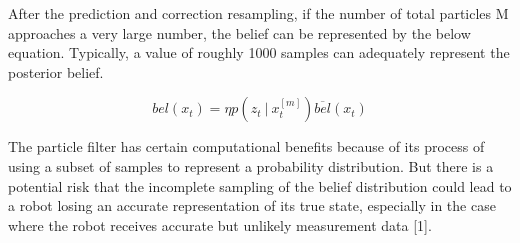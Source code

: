 \documentclass[twoside]{article}
\begin{document}
After the prediction and correction resampling, if the number of total particles M approaches a very large number, the belief can be represented by the below equation. Typically, a value of roughly 1000 samples can adequately represent the posterior belief. 

\begin{equation}
    bel(x_t) = \eta  p(z_t \ |\ x_t^{[m]})\overline{bel}(x_t)  
\end{equation} 

The particle filter has certain computational benefits because of its process of using a subset of samples to represent a probability distribution. But there is a potential risk that the incomplete sampling of the belief distribution could lead to a robot losing an accurate representation of its true state, especially in the case where the robot receives accurate but unlikely measurement data [1]. 




%    

\end{document}
